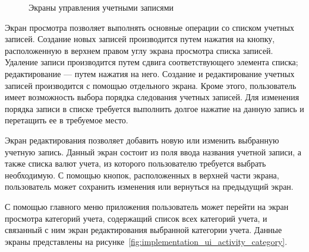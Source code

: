 \begin{figure}[h!]
  \centering
  \caption{Экраны управления учетными записями}
  \label{fig:implementation_ui_activity_account}
\end{figure}

Экран просмотра позволяет выполнять основные операции
со списком учетных записей.
Создание новых записей производится путем нажатия на кнопку,
расположенную в верхнем правом углу экрана просмотра списка записей.
Удаление записи производится путем сдвига соответствующего элемента списка;
редактирование --- путем нажатия на него.
Создание и редактирование учетных записей производится с помощью
отдельного экрана.
Кроме этого, пользователь имеет возможность выбора порядка следования
учетных записей. Для изменения порядка записи в списке требуется
выполнить долгое нажатие на данную запись и перетащить ее в требуемое место.

Экран редактирования позволяет добавить новую или изменить выбранную
учетную запись. Данный экран состоит из поля ввода названия учетной записи,
а также списка валют учета, из которого пользователю требуется выбрать необходимую.
С помощью кнопок, расположенных в верхней части экрана, пользователь
может сохранить изменения или вернуться на предыдущий экран.

С помощью главного меню приложения пользователь может перейти на
экран просмотра категорий учета, содержащий список всех категорий учета,
и связанный с ним экран редактирования выбранной категории учета.
Данные экраны представлены на рисунке~\ref{fig:implementation_ui_activity_category}.

